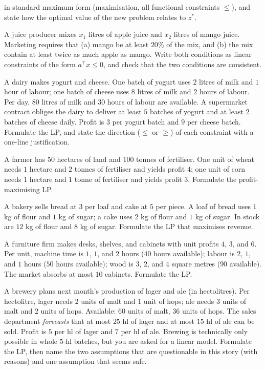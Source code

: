 \begin{problems}
\[        \]
        in standard maximum form (maximisation, all functional constraints
        $\le$), and state how the optimal value of the new problem relates
        to $z^{*}$.
  \item A juice producer mixes $x_1$ litres of apple juice and $x_2$
        litres of mango juice. Marketing requires that (a) mango be at
        least $20\%$ of the mix, and (b) the mix contain at least twice as
        much apple as mango. Write both conditions as linear constraints
        of the form $a^{\top}x\le 0$, and check that the two conditions
        are consistent.
  \item A dairy makes yogurt and cheese. One batch of yogurt uses $2$
        litres of milk and $1$ hour of labour; one batch of cheese uses
        $8$ litres of milk and $2$ hours of labour. Per day, $80$ litres
        of milk and $30$ hours of labour are available. A supermarket
        contract obliges the dairy to deliver at least $5$ batches of
        yogurt and at least $2$ batches of cheese daily. Profit is $3$ per
        yogurt batch and $9$ per cheese batch. Formulate the LP, and state
        the direction ($\le$ or $\ge$) of each constraint with a one-line
        justification.
  \item A farmer has $50$ hectares of land and $100$ tonnes of
        fertiliser. One unit of wheat needs $1$ hectare and $2$ tonnes of
        fertiliser and yields profit $4$; one unit of corn needs $1$
        hectare and $1$ tonne of fertiliser and yields profit $3$.
        Formulate the profit-maximising LP.
  \item A bakery sells bread at $3$ per loaf and cake at $5$ per piece. A
        loaf of bread uses $1$ kg of flour and $1$ kg of sugar; a cake
        uses $2$ kg of flour and $1$ kg of sugar. In stock are $12$ kg of
        flour and $8$ kg of sugar. Formulate the LP that maximises
        revenue.
  \item A furniture firm makes desks, shelves, and cabinets with unit
        profits $4$, $3$, and $6$. Per unit, machine time is $1$, $1$, and
        $2$ hours ($40$ hours available); labour is $2$, $1$, and $1$
        hours ($50$ hours available); wood is $3$, $2$, and $4$ square
        metres ($90$ available). The market absorbs at most $10$ cabinets.
        Formulate the LP.
  \item A brewery plans next month's production of lager and ale (in
        hectolitres). Per hectolitre, lager needs $2$ units of malt and
        $1$ unit of hops; ale needs $3$ units of malt and $2$ units of
        hops. Available: $60$ units of malt, $36$ units of hops. The sales
        department \emph{forecasts} that at most $25$ hl of lager and at
        most $15$ hl of ale can be sold. Profit is $5$ per hl of lager and
        $7$ per hl of ale. Brewing is technically only possible in whole
        $5$-hl batches, but you are asked for a linear model. Formulate
        the LP, then name the two assumptions that are questionable in
        this story (with reasons) and one assumption that seems safe.
\end{problems}

